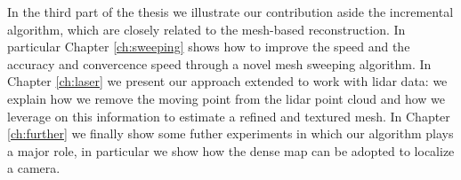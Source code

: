 In the third part of the thesis we illustrate our contribution aside the incremental algorithm, which are closely related to the mesh-based reconstruction.
In particular Chapter \ref{ch:sweeping} shows how to improve the speed and the accuracy and convercence speed through a novel mesh sweeping algorithm.
In Chapter \ref{ch:laser} we present our approach extended to work with lidar data: we explain how we remove the moving point from the lidar point cloud and how we leverage on this information to estimate a refined and textured mesh.
In Chapter \ref{ch:further} we finally show some futher experiments in which our algorithm plays a major role, in particular we show how the dense map can be adopted to localize a camera.














